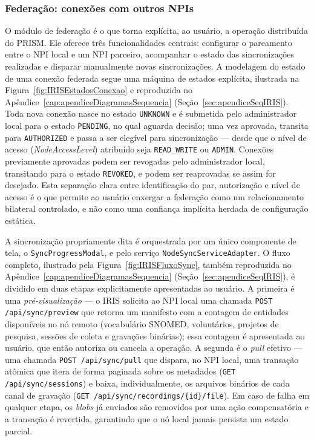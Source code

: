 \subsubsection{Federação: conexões com outros NPIs}\label{subsubsec:IRISFederacao}

O módulo de federação é o que torna explícita, ao usuário, a operação distribuída do PRISM. Ele oferece três funcionalidades centrais: configurar o pareamento entre o NPI local e um NPI parceiro, acompanhar o estado das sincronizações realizadas e disparar manualmente novas sincronizações. A modelagem do estado de uma conexão federada segue uma máquina de estados explícita, ilustrada na Figura~\ref{fig:IRISEstadosConexao} e reproduzida no Apêndice~\ref{cap:apendiceDiagramasSequencia} (Seção~\ref{sec:apendiceSeqIRIS}). Toda nova conexão nasce no estado \texttt{UNKNOWN} e é submetida pelo administrador local para o estado \texttt{PENDING}, no qual aguarda decisão; uma vez aprovada, transita para \texttt{AUTHORIZED} e passa a ser elegível para sincronização --- desde que o nível de acesso (\textit{NodeAccessLevel}) atribuído seja \texttt{READ\_WRITE} ou \texttt{ADMIN}. Conexões previamente aprovadas podem ser revogadas pelo administrador local, transitando para o estado \texttt{REVOKED}, e podem ser reaprovadas se assim for desejado. Esta separação clara entre identificação do par, autorização e nível de acesso é o que permite ao usuário enxergar a federação como um relacionamento bilateral controlado, e não como uma confiança implícita herdada de configuração estática.

A sincronização propriamente dita é orquestrada por um único componente de tela, o \texttt{SyncProgressModal}, e pelo serviço \texttt{NodeSyncServiceAdapter}. O fluxo completo, ilustrado pela Figura~\ref{fig:IRISFluxoSync}, também reproduzida no Apêndice~\ref{cap:apendiceDiagramasSequencia} (Seção~\ref{sec:apendiceSeqIRIS}), é dividido em duas etapas explicitamente apresentadas ao usuário. A primeira é uma \textit{pré-visualização} --- o IRIS solicita ao NPI local uma chamada \texttt{POST /api/sync/preview} que retorna um manifesto com a contagem de entidades disponíveis no nó remoto (vocabulário SNOMED, voluntários, projetos de pesquisa, sessões de coleta e gravações binárias); essa contagem é apresentada ao usuário, que então autoriza ou cancela a operação. A segunda é o \textit{pull} efetivo --- uma chamada \texttt{POST /api/sync/pull} que dispara, no NPI local, uma transação atômica que itera de forma paginada sobre os metadados (\texttt{GET /api/sync/sessions}) e baixa, individualmente, os arquivos binários de cada canal de gravação (\texttt{GET /api/sync/recordings/\{id\}/file}). Em caso de falha em qualquer etapa, os \textit{blobs} já enviados são removidos por uma ação compensatória e a transação é revertida, garantindo que o nó local jamais persista um estado parcial.

